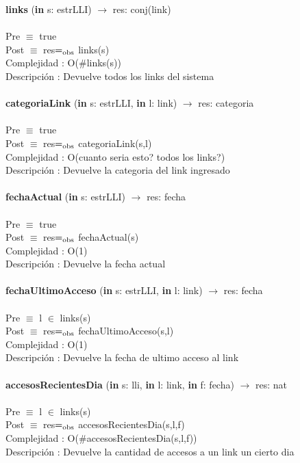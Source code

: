 \documentclass[10pt, a4paper]{article}
\begin{document}
	\textbf{links} (\textbf{in} s: estrLLI) $\longrightarrow$ res: conj(link)\\\\
	Pre $\equiv$ {true}\\
	Post $\equiv$ {res$=_{\mathrm{obs}}$ links(s)}\\
	Complejidad : O($\#$links(s))\\
	Descripci\'{o}n : Devuelve todos los links del sistema\\\\
	
	\textbf{categoriaLink} (\textbf{in} s: estrLLI, \textbf{in} l: link) $\longrightarrow$ res: categoria\\\\
	Pre $\equiv$ {true}\\
	Post $\equiv$ {res$=_{\mathrm{obs}}$ categoriaLink(s,l)}\\
	Complejidad : O(cuanto seria esto? todos los links?)\\
	Descripci\'{o}n : Devuelve la categoria del link ingresado\\\\

	\textbf{fechaActual} (\textbf{in} s: estrLLI) $\longrightarrow$ res: fecha\\\\
	Pre $\equiv$ {true}\\
	Post $\equiv$ {res$=_{\mathrm{obs}}$ fechaActual(s)}\\
	Complejidad : O(1)\\
	Descripci\'{o}n : Devuelve la fecha actual\\\\
	
	\textbf{fechaUltimoAcceso} (\textbf{in} s: estrLLI, \textbf{in} l: link) $\longrightarrow$ res: fecha\\\\
	Pre $\equiv$ {l $\in$ links(s)}\\
	Post $\equiv$ {res$=_{\mathrm{obs}}$ fechaUltimoAcceso(s,l)}\\
	Complejidad : O(1)\\
	Descripci\'{o}n : Devuelve la fecha de ultimo acceso al link\\\\
	
	\textbf{accesosRecientesDia} (\textbf{in} s: lli, \textbf{in} l: link, \textbf{in} f: fecha) $\longrightarrow$ res: nat\\\\
	Pre $\equiv$ {l $\in$ links(s)}\\
	Post $\equiv$ {res$=_{\mathrm{obs}}$ accesosRecientesDia(s,l,f)}\\
	Complejidad : O($\#$accesosRecientesDia(s,l,f))\\
	Descripci\'{o}n : Devuelve la cantidad de accesos a un link un cierto dia\\\\
	
\end{document}
